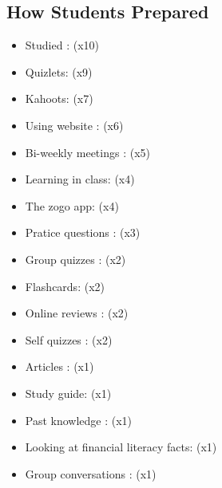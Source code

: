 \documentclass{article}%
\begin{document}
%
\begin{multicols}{2}%
\section{How Students Prepared}%
\label{sec:HowStudentsPrepared}%
\begin{itemize}%
\item%
Studied : (x10)%
\item%
Quizlets: (x9)%
\item%
Kahoots: (x7)%
\item%
Using website : (x6)%
\item%
Bi{-}weekly meetings : (x5)%
\item%
Learning in class: (x4)%
\item%
The zogo app: (x4)%
\item%
Pratice questions : (x3)%
\item%
Group quizzes : (x2)%
\item%
Flashcards: (x2)%
\item%
Online reviews : (x2)%
\item%
Self quizzes : (x2)%
\item%
Articles : (x1)%
\item%
Study guide: (x1)%
\item%
Past knowledge : (x1)%
\item%
Looking at financial literacy facts: (x1)%
\item%
Group conversations : (x1)%
\end{itemize}

%
\end{multicols}%
\noindent\makebox[\linewidth]{\rule{\paperwidth}{0.4pt}}%
\end{document}
